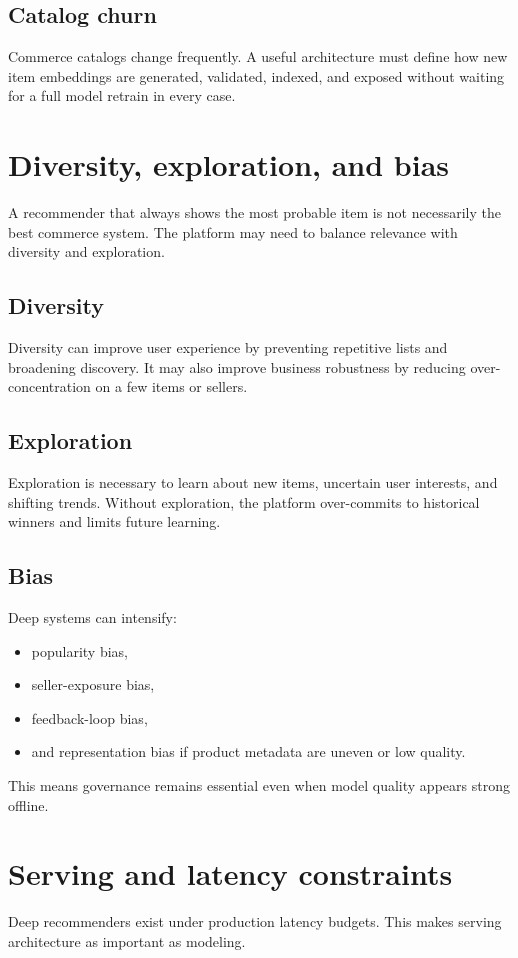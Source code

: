 \subsection{Catalog churn}
Commerce catalogs change frequently.
A useful architecture must define how new item embeddings are generated, validated, indexed, and exposed without waiting for a full model retrain in every case.

\section{Diversity, exploration, and bias}
A recommender that always shows the most probable item is not necessarily the best commerce system.
The platform may need to balance relevance with diversity and exploration.

\subsection{Diversity}
Diversity can improve user experience by preventing repetitive lists and broadening discovery.
It may also improve business robustness by reducing over-concentration on a few items or sellers.

\subsection{Exploration}
Exploration is necessary to learn about new items, uncertain user interests, and shifting trends.
Without exploration, the platform over-commits to historical winners and limits future learning.

\subsection{Bias}
Deep systems can intensify:
\begin{itemize}
  \item popularity bias,
  \item seller-exposure bias,
  \item feedback-loop bias,
  \item and representation bias if product metadata are uneven or low quality.
\end{itemize}

This means governance remains essential even when model quality appears strong offline.

\section{Serving and latency constraints}
Deep recommenders exist under production latency budgets.
This makes serving architecture as important as modeling.

